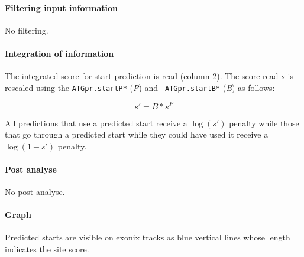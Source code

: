 \paragraph{Filtering input information}

No filtering.

\paragraph{Integration of information}

The integrated score for start prediction is read (column 2).  The
score read $s$ is rescaled using the {\tt ATGpr.startP*} (\emph{P}) and {\tt
ATGpr.startB*} (\emph{B}) as follows:

\[s' = B*s^P\]

All predictions that use a predicted start receive a $\log(s')$
penalty while those that go through a predicted start while they
could have used it receive a $\log(1-s')$ penalty.


\paragraph{Post analyse}

No post analyse.

\paragraph{Graph}

Predicted starts are visible on exonix tracks as blue vertical lines
whose length indicates the site score.
